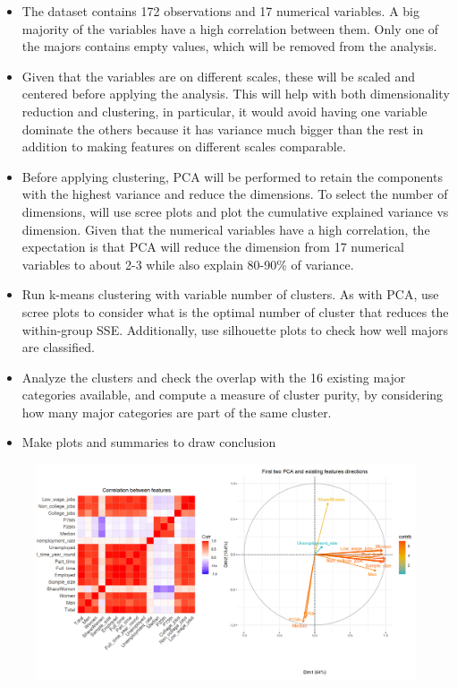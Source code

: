 \documentclass[11pt,a4paper]{article}
\begin{document}
\begin{itemize}
    \item The dataset contains 172 observations and 17 numerical variables. A big majority of the variables have a high correlation between them. Only one of the majors contains empty values, which will be removed from the analysis.
    \item Given that the variables are on different scales, these will be scaled and centered before applying the analysis. This will help with both dimensionality reduction and clustering, in particular, it would avoid having one variable dominate the others because it has variance much bigger than the rest in addition to making features on different scales comparable.
    \item Before applying clustering, PCA will be performed to retain the components with the highest variance and reduce the dimensions. To select the number of dimensions, will use scree plots and plot the cumulative explained variance vs dimension. Given that the numerical variables have a high correlation, the expectation is that PCA will reduce the dimension from 17 numerical variables to about 2-3 while also explain 80-90\% of variance.
    \item Run k-means clustering with variable number of clusters. As with PCA, use scree plots to consider what is the optimal number of cluster that reduces the within-group SSE. Additionally, use silhouette plots to check how well majors are classified.
    \item Analyze the clusters and check the overlap with the 16 existing major categories available, and compute a measure of cluster purity, by considering how many major categories are part of the same cluster.
    \item Make plots and summaries to draw conclusion 
\end{itemize}

\begin{figure} [H]
    \begin{center}
        \includegraphics[scale=1, width=18cm]{plots.png}
        \label{fig:sampledvsdata}
    \end{center}
\end{figure}
\end{document}

